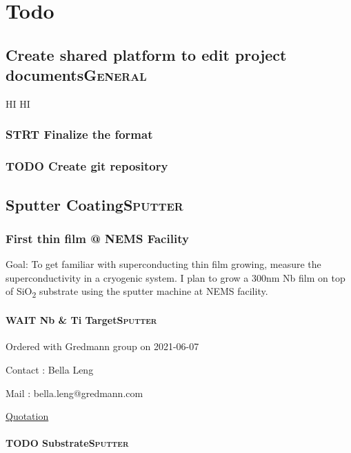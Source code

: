 \documentclass[11pt]{article}
\begin{document}
\section*{Todo}
\label{sec:org9bd60d5}
\subsection*{Create shared platform to edit project documents\hfill{}\textsc{General}}
\label{sec:orga81f206}

HI HI

\subsubsection*{{\bfseries\sffamily STRT} Finalize the format}
\label{sec:org7280cca}
\subsubsection*{{\bfseries\sffamily TODO} Create git repository}
\label{sec:org3cd2cdd}

\subsection*{Sputter Coating\hfill{}\textsc{Sputter}}
\label{sec:orgcc03371}

\subsubsection*{First thin film @ NEMS Facility}
\label{sec:orgd1503f1}
Goal: To get familiar with superconducting thin film growing, measure the superconductivity in a cryogenic system. I plan to grow a 300nm Nb film on top of SiO\textsubscript{2} substrate using the sputter machine at NEMS facility.\cite{NEMS_official}

\paragraph*{{\bfseries\sffamily WAIT} Nb \& Ti Target\hfill{}\textsc{Sputter}}
\label{sec:org4b2ca4c}
Ordered with Gredmann group on 2021-06-07

Contact : Bella Leng

Mail : bella.leng@gredmann.com

\href{Todo/2021-07-09\_09-49-32\_Stathes Paganis-1.pdf}{Quotation}

\paragraph*{{\bfseries\sffamily TODO} Substrate\hfill{}\textsc{Sputter}}
\label{sec:org7dc2137}
\end{document}

